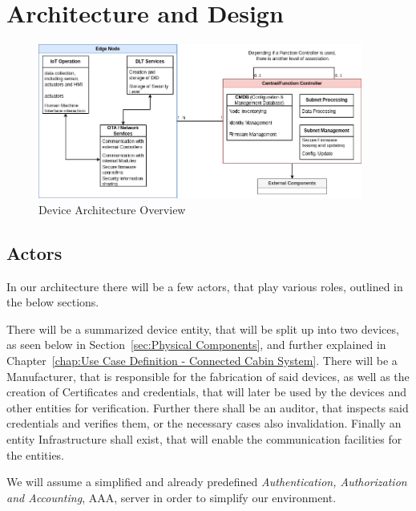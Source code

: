 \chapter{Architecture and Design}
\label{chap:Architecture and Design}

\begin{figure}
	\begin{center}
		\includegraphics[width=0.95\textwidth]{figures/device-architecture-overview.png}
	\end{center}
	\caption{Device Architecture Overview}
	\label{fig:device-architecture-overview}
\end{figure}

\section{Actors} %
\label{sec:Actors-design}
In our architecture there will be a few actors, that play various roles, outlined in the below sections.

There will be a summarized device entity, that will be split up into two devices, as seen below in
Section~\ref{sec:Physical Components}, and further explained in Chapter~\ref{chap:Use Case Definition - Connected Cabin
	System}.
There will be a Manufacturer, that is responsible for the fabrication of said devices, as well as the creation of
Certificates and credentials, that will later be used by the devices and other entities for verification.
Further there shall be an auditor, that inspects said credentials and verifies them, or the necessary cases also
invalidation.
Finally an entity Infrastructure shall exist, that will enable the communication facilities for the entities.

We will assume a simplified and already predefined \textit{Authentication, Authorization and Accounting}, AAA, server
in order to simplify our environment.


